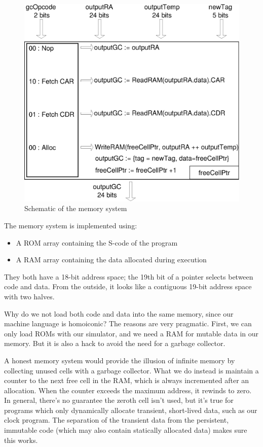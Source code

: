 \documentclass[a4paper, 11pt]{article}
\begin{document}
\begin{figure}[h]
\center
\caption{Schematic of the memory system}
   \includegraphics[scale=0.5]{GC.eps}
\end{figure}

The memory system is implemented using:
\begin{itemize}
\item A ROM array containing the S-code of the program
\item A RAM array containing the data allocated during execution
\end{itemize}
They both have a 18-bit address space; the 19th bit of a pointer selects between code and data. From the outside, it looks like a contiguous 19-bit address space with two halves.

Why do we not load both code and data into the same memory, since our machine language is homoiconic? The reasons are very pragmatic. First, we can only load ROMs with our simulator, and we need a RAM for mutable data in our memory. But it is also a hack to avoid the need for a garbage collector.

A honest memory system would provide the illusion of infinite memory by collecting unused cells with a garbage collector. What we do instead is maintain a counter to the next free cell in the RAM, which is always incremented after an allocation. When the counter exceeds the maximum address, it rewinds to zero. In general, there's no guarantee the zeroth cell isn't used, but it's true for programs which only dynamically allocate transient, short-lived data, such as our clock program. The separation of the transient data from the persistent, immutable code (which may also contain statically allocated data) makes sure this works.
\end{document}
